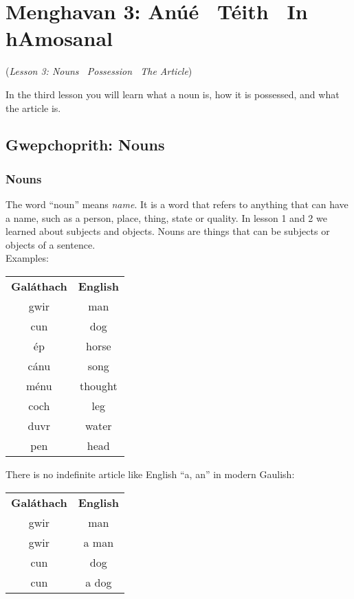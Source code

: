 \section{Menghavan 3: An\'{u}\'{e} \textendash\ T\'{e}ith \textendash\ In hAmosanal}
(\textit{Lesson 3: Nouns \textendash\ Possession \textendash\ The Article})

In the third lesson you will learn what a noun is, how it is possessed, and what the article is.\\

\subsection{Gwepchoprith: Nouns}
\subsubsection{Nouns}

The word ``noun'' means \textit{name}. It is a word that refers to anything that can have a name, such as a person, place, thing, state or quality. In lesson 1 and 2 we learned about subjects and objects. Nouns are things that can be subjects or objects of a sentence.\\

Examples:
\begin{table}[H]
\centering
\begin{tabular}{cc}
  \toprule
  \textbf{Gal\'{a}thach} & \textbf{English}\\
  \cmidrule(lr){1-1}\cmidrule(lr){2-2}
  gwir & man\\
  cun & dog\\
  \'{e}p & horse\\
  c\'{a}nu & song\\
  m\'{e}nu & thought\\
  coch & leg\\
  duvr & water\\
  pen & head\\
  \bottomrule
\end{tabular}
\label{examples_nouns}
\end{table}

There is no indefinite article like English ``a, an'' in modern Gaulish:
\begin{table}[H]
\centering
\begin{tabular}{cc}
  \toprule
  \textbf{Gal\'{a}thach} & \textbf{English}\\
  \cmidrule(lr){1-1}\cmidrule(lr){2-2}
  gwir & man\\
  gwir & a man\\
  cun & dog\\
  cun & a dog\\
  \bottomrule
\end{tabular}
\label{examples_no_indefinite_article}
\end{table}


